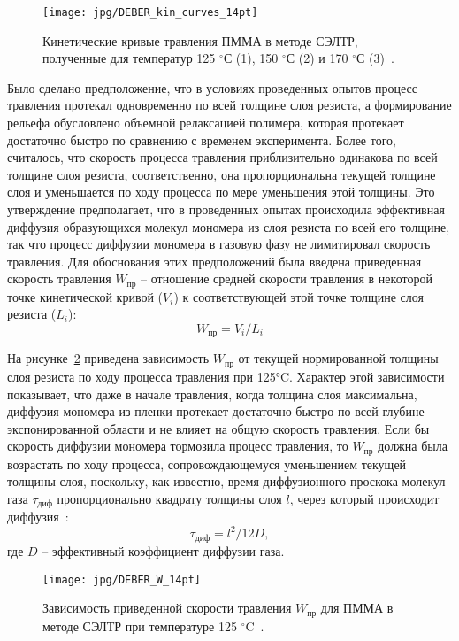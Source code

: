 \begin{figure}
	\centering
	\texttt{[image: jpg/DEBER\_kin\_curves\_14pt]}
	\caption{Кинетические кривые травления ПММА в методе СЭЛТР, полученные для температур 125 $^\circ$С (1), 150 $^\circ$С (2) и 170 $^\circ$С (3)~\cite{Bruk_2013}.}
	\label{fig:kin_curves}
\end{figure}

Было сделано предположение, что в условиях проведенных опытов процесс травления протекал одновременно по всей толщине слоя резиста, а формирование рельефа обусловлено объемной релаксацией полимера, которая протекает достаточно быстро по сравнению с временем эксперимента. Более того, считалось, что скорость процесса травления приблизительно одинакова по всей толщине слоя резиста, соответственно, она пропорциональна текущей толщине слоя и уменьшается по ходу процесса по мере уменьшения этой толщины. Это утверждение предполагает, что в проведенных опытах происходила эффективная диффузия образующихся молекул мономера из слоя резиста по всей его толщине, так что процесс диффузии мономера в газовую фазу не лимитировал скорость травления. Для обоснования этих предположений была введена приведенная скорость травления $W_{\text{пр}}$ -- отношение средней скорости травления в некоторой точке кинетической кривой ($V_i$) к соответствующей этой точке толщине слоя резиста ($L_i$):
\begin{equation}
	W_{пр} = V_i / L_i
\end{equation}

На рисунке~\ref{fig:DEBER_W} приведена зависимость $W_{\text{пр}}$ от текущей нормированной толщины слоя резиста по ходу процесса травления при 125°C. Характер этой зависимости показывает, что даже в начале травления, когда толщина слоя максимальна, диффузия мономера из пленки протекает достаточно быстро по всей глубине экспонированной области и не влияет на общую скорость травления. Если бы скорость диффузии мономера тормозила процесс травления, то $W_{\text{пр}}$ должна была возрастать по ходу процесса, сопровождающемуся уменьшением текущей толщины слоя, поскольку, как известно, время диффузионного проскока молекул газа $\tau_{\text{диф}}$ пропорционально квадрату толщины слоя $l$, через который происходит диффузия~\cite{Bruk_2000}:
\begin{equation}
	\tau_{\text{диф}} = l^2 / 12 D,
\end{equation}
где $D$ -- эффективный коэффициент диффузии газа.

\begin{figure}
	\centering
	\texttt{[image: jpg/DEBER\_W\_14pt]}
	\caption{Зависимость приведенной скорости травления $W_{пр}$ для ПММА в методе СЭЛТР при температуре 125 $^\circ$C~\cite{Bruk_2013}.}
	\label{fig:DEBER_W}
\end{figure}

